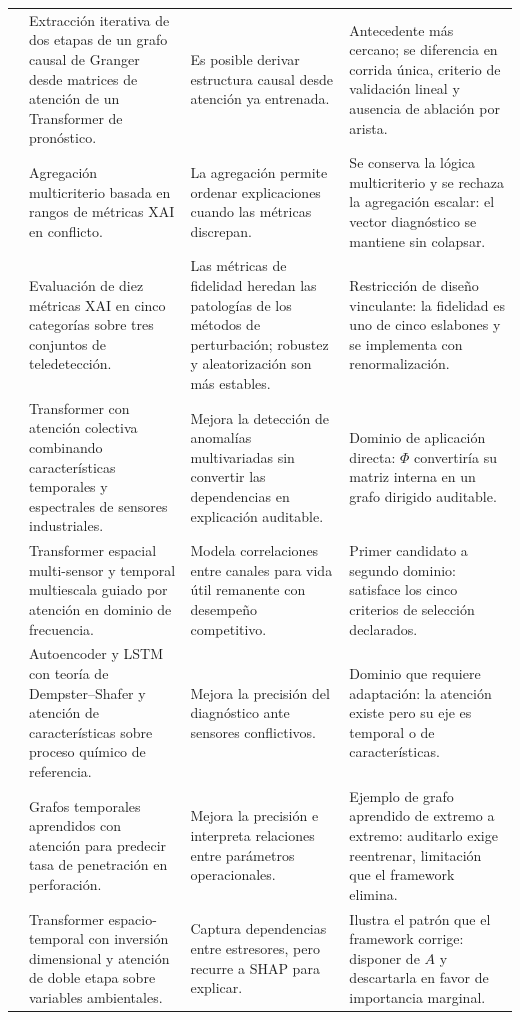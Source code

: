 {\begin{longtable}{P{0.19}P{0.25}P{0.28}P{0.28}}
\cite{zhu2025attention} & Extracción iterativa de dos etapas de un grafo causal de Granger desde matrices de atención de un Transformer de pronóstico. & Es posible derivar estructura causal desde atención ya entrenada. & Antecedente más cercano; se diferencia en corrida única, criterio de validación lineal y ausencia de ablación por arista.\\
\cite{chatterjee2025multicriteria} & Agregación multicriterio basada en rangos de métricas XAI en conflicto. & La agregación permite ordenar explicaciones cuando las métricas discrepan. & Se conserva la lógica multicriterio y se rechaza la agregación escalar: el vector diagnóstico se mantiene sin colapsar.\\
\cite{klotz2025xai} & Evaluación de diez métricas XAI en cinco categorías sobre tres conjuntos de teledetección. & Las métricas de fidelidad heredan las patologías de los métodos de perturbación; robustez y aleatorización son más estables. & Restricción de diseño vinculante: la fidelidad es uno de cinco eslabones y se implementa con renormalización.\\
\cite{han2026tscad} & Transformer con atención colectiva combinando características temporales y espectrales de sensores industriales. & Mejora la detección de anomalías multivariadas sin convertir las dependencias en explicación auditable. & Dominio de aplicación directa: $\Phi$ convertiría su matriz interna en un grafo dirigido auditable.\\
\cite{qin2026multisensor} & Transformer espacial multi-sensor y temporal multiescala guiado por atención en dominio de frecuencia. & Modela correlaciones entre canales para vida útil remanente con desempeño competitivo. & Primer candidato a segundo dominio: satisface los cinco criterios de selección declarados.\\
\cite{ewuzie2026robust} & Autoencoder y LSTM con teoría de Dempster--Shafer y atención de características sobre proceso químico de referencia. & Mejora la precisión del diagnóstico ante sensores conflictivos. & Dominio que requiere adaptación: la atención existe pero su eje es temporal o de características.\\
\cite{zhang2026ehtgnn} & Grafos temporales aprendidos con atención para predecir tasa de penetración en perforación. & Mejora la precisión e interpreta relaciones entre parámetros operacionales. & Ejemplo de grafo aprendido de extremo a extremo: auditarlo exige reentrenar, limitación que el framework elimina.\\
\cite{kapoor2026fustt} & Transformer espacio-temporal con inversión dimensional y atención de doble etapa sobre variables ambientales. & Captura dependencias entre estresores, pero recurre a SHAP para explicar. & Ilustra el patrón que el framework corrige: disponer de $A$ y descartarla en favor de importancia marginal.\\

\end{longtable}}
